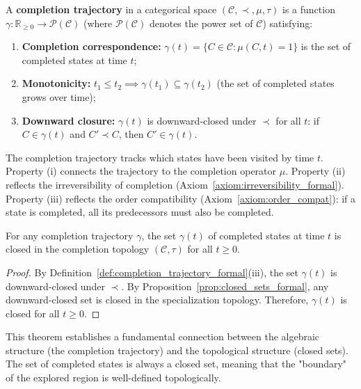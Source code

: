\begin{definition}
\label{def:completion_trajectory_formal}
A \textbf{completion trajectory} in a categorical space $(\mathcal{C}, \prec, \mu, \tau)$ is a function $\gamma: \mathbb{R}_{\geq 0} \to \mathcal{P}(\mathcal{C})$ (where $\mathcal{P}(\mathcal{C})$ denotes the power set of $\mathcal{C}$) satisfying:
\begin{enumerate}[label=(\roman*)]
    \item \textbf{Completion correspondence:} $\gamma(t) = \{C \in \mathcal{C} : \mu(C, t) = 1\}$ is the set of completed states at time $t$;
    
    \item \textbf{Monotonicity:} $t_1 \leq t_2 \implies \gamma(t_1) \subseteq \gamma(t_2)$ (the set of completed states grows over time);
    
    \item \textbf{Downward closure:} $\gamma(t)$ is downward-closed under $\prec$ for all $t$: if $C \in \gamma(t)$ and $C' \prec C$, then $C' \in \gamma(t)$.
\end{enumerate}
\end{definition}

The completion trajectory tracks which states have been visited by time $t$. Property (i) connects the trajectory to the completion operator $\mu$. Property (ii) reflects the irreversibility of completion (Axiom~\ref{axiom:irreversibility_formal}). Property (iii) reflects the order compatibility (Axiom~\ref{axiom:order_compat}): if a state is completed, all its predecessors must also be completed.

\begin{theorem}
\label{thm:trajectory_closure_formal}
For any completion trajectory $\gamma$, the set $\gamma(t)$ of completed states at time $t$ is closed in the completion topology $(\mathcal{C}, \tau)$ for all $t \geq 0$.
\end{theorem}

\begin{proof}
By Definition~\ref{def:completion_trajectory_formal}(iii), the set $\gamma(t)$ is downward-closed under $\prec$. By Proposition~\ref{prop:closed_sets_formal}, any downward-closed set is closed in the specialization topology. Therefore, $\gamma(t)$ is closed for all $t \geq 0$.
\end{proof}

This theorem establishes a fundamental connection between the algebraic structure (the completion trajectory) and the topological structure (closed sets). The set of completed states is always a closed set, meaning that the "boundary" of the explored region is well-defined topologically.

